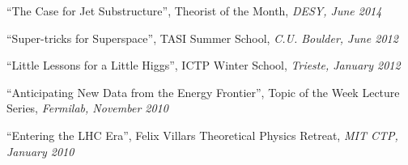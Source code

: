 \item ``The Case for Jet Substructure'', Theorist of the Month, \emph{DESY, June 2014}

\item ``Super-tricks for Superspace'', TASI Summer School, \emph{C.U. Boulder, June 2012}

\item ``Little Lessons for a Little Higgs'', ICTP Winter School, \emph{Trieste, January 2012}

\item ``Anticipating New Data from the Energy Frontier'', Topic of the Week Lecture Series, \emph{Fermilab, November 2010}

\item ``Entering the LHC Era'', Felix Villars Theoretical Physics Retreat, \emph{MIT CTP, January 2010}

\el
